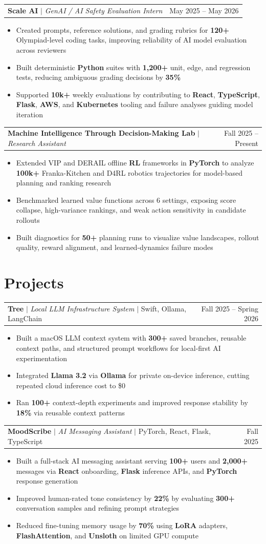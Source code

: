 \documentclass[letterpaper,10pt]{article}
\makeatletter
\newcommand{\resumeWorkHeading}[2]{%
  \vspace{1pt}\noindent
  \begin{tabular*}{\textwidth}{@{}l@{\extracolsep{\fill}}r@{}}
    #1 & #2 \\
  \end{tabular*}%
  \vspace{-4pt}
}
\newcommand{\resumeItemListStart}{\begin{itemize}}
\newcommand{\resumeItemListEnd}{\end{itemize}\vspace{0pt}}
\newcommand{\resumeItem}[1]{\item #1}
\makeatother
\begin{document}
\resumeWorkHeading
{\textbf{Scale AI} $|$ \emph{GenAI / AI Safety Evaluation Intern}}{May 2025 -- May 2026}
\resumeItemListStart
\resumeItem{Created prompts, reference solutions, and grading rubrics for \textbf{120+} Olympiad-level coding tasks, improving reliability of AI model evaluation across reviewers}
\resumeItem{Built deterministic \textbf{Python} suites with \textbf{1,200+} unit, edge, and regression tests, reducing ambiguous grading decisions by \textbf{35\%}}
\resumeItem{Supported \textbf{10k+} weekly evaluations by contributing to \textbf{React}, \textbf{TypeScript}, \textbf{Flask}, \textbf{AWS}, and \textbf{Kubernetes} tooling and failure analyses guiding model iteration}
\resumeItemListEnd

\resumeWorkHeading
{\textbf{Machine Intelligence Through Decision-Making Lab} $|$ \emph{Research Assistant}}{Fall 2025 -- Present}
\resumeItemListStart
\resumeItem{Extended VIP and DERAIL offline \textbf{RL} frameworks in \textbf{PyTorch} to analyze \textbf{100k+} Franka-Kitchen and D4RL robotics trajectories for model-based planning and ranking research}
\resumeItem{Benchmarked learned value functions across 6 settings, exposing score collapse, high-variance rankings, and weak action sensitivity in candidate rollouts}
\resumeItem{Built diagnostics for \textbf{50+} planning runs to visualize value landscapes, rollout quality, reward alignment, and learned-dynamics failure modes}
\resumeItemListEnd

\section{Projects}
\resumeWorkHeading
{\textbf{Tree} $|$ \emph{Local LLM Infrastructure System} $|$ Swift, Ollama, LangChain}{Fall 2025 -- Spring 2026}
\resumeItemListStart
\resumeItem{Built a macOS LLM context system with \textbf{300+} saved branches, reusable context paths, and structured prompt workflows for local-first AI experimentation}
\resumeItem{Integrated \textbf{Llama 3.2} via \textbf{Ollama} for private on-device inference, cutting repeated cloud inference cost to \$0}
\resumeItem{Ran \textbf{100+} context-depth experiments and improved response stability by \textbf{18\%} via reusable context patterns}
\resumeItemListEnd

\resumeWorkHeading
{\textbf{MoodScribe} $|$ \emph{AI Messaging Assistant} $|$ PyTorch, React, Flask, TypeScript}{Fall 2025}
\resumeItemListStart
\resumeItem{Built a full-stack AI messaging assistant serving \textbf{100+} users and \textbf{2,000+} messages via \textbf{React} onboarding, \textbf{Flask} inference APIs, and \textbf{PyTorch} response generation}
\resumeItem{Improved human-rated tone consistency by \textbf{22\%} by evaluating \textbf{300+} conversation samples and refining prompt strategies}
\resumeItem{Reduced fine-tuning memory usage by \textbf{70\%} using \textbf{LoRA} adapters, \textbf{FlashAttention}, and \textbf{Unsloth} on limited GPU compute}
\resumeItemListEnd
\end{document}
